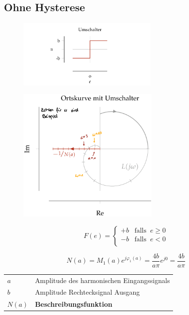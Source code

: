\documentclass[
  10pt,
  a4paper,
  twocolumn]{article}
\makeatletter
\numberwithin{equation}{section}
\newenvironment{conditions}
  {\par\vspace{\abovedisplayskip}\noindent\begin{tabular}{>{$}l<{$} @{${}:{}$} l}}
  {\end{tabular}\par\vspace{\belowdisplayskip}}
\makeatother
\begin{document}
\hypertarget{ohne-hysterese}{%
\subsection{Ohne Hysterese}\label{ohne-hysterese}}

\begin{figure}[H]

{\centering \includegraphics[width=7cm,height=3.4cm]{images/paste-49.png}

}

\end{figure}

\begin{figure}[H]

{\centering \includegraphics[width=7cm,height=\textheight]{images/paste-47.png}

}

\end{figure}

\[
F(e)=\left\{
\begin{array}{ll}
+b & \text{falls }\ e \geq 0 \\
-b & \text{falls }\ e < 0 \\
\end{array}
\right.
\]

\[
N(a) = M_1(a)e^{j\varphi_1(a)}=\frac{4b}{a\pi}e^{j0}=\frac{4b}{a\pi}
\]

\begin{conditions}
  a & Amplitude des harmonischen Eingangssignals \\
  b & Amplitude Rechtecksignal Ausgang \\
  N(a) & \textbf{Beschreibungsfunktion}
\end{conditions}
\end{document}
